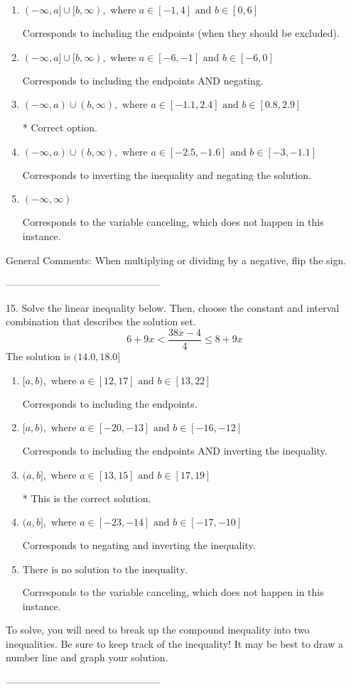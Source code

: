 \documentclass{article}[10pt]
\begin{document}
\begin{enumerate}[label=\Alph*.] 
\item $ (-\infty, a] \cup [b, \infty), \text{ where } a \in [-1, 4] \text{ and } b \in [0, 6] $ 

 Corresponds to including the endpoints (when they should be excluded). 
\item $ (-\infty, a] \cup [b, \infty), \text{ where } a \in [-6, -1] \text{ and } b \in [-6, 0] $ 

 Corresponds to including the endpoints AND negating. 
\item $ (-\infty, a) \cup (b, \infty), \text{ where } a \in [-1.1, 2.4] \text{ and } b \in [0.8, 2.9] $ 

  * Correct option. 
\item $ (-\infty, a) \cup (b, \infty), \text{ where } a \in [-2.5, -1.6] \text{ and } b \in [-3, -1.1] $ 

 Corresponds to inverting the inequality and negating the solution. 
\item $ (-\infty, \infty) $ 

 Corresponds to the variable canceling, which does not happen in this instance. 
\end{enumerate} 
 
General Comments: When multiplying or dividing by a negative, flip the sign.

-----------------------------------------------

15. Solve the linear inequality below. Then, choose the constant and interval combination that describes the solution set.
$$ 6 + 9 x < \frac{38 x - 4}{4} \leq 8 + 9 x $$ 
The solution is $ (14.0, 18.0] $ 

\begin{enumerate}[label=\Alph*.] 
\item $ [a, b), \text{ where } a \in [12, 17] \text{ and } b \in [13, 22] $ 

 Corresponds to including the endpoints. 
\item $ [a, b), \text{ where } a \in [-20, -13] \text{ and } b \in [-16, -12] $ 

 Corresponds to including the endpoints AND inverting the inequality. 
\item $ (a, b], \text{ where } a \in [13, 15] \text{ and } b \in [17, 19] $ 

  * This is the correct solution. 
\item $ (a, b], \text{ where } a \in [-23, -14] \text{ and } b \in [-17, -10] $ 

 Corresponds to negating and inverting the inequality. 
\item $ \text{There is no solution to the inequality.} $ 

 Corresponds to the variable canceling, which does not happen in this instance. 
\end{enumerate} 
 
To solve, you will need to break up the compound inequality into two inequalities. Be sure to keep track of the inequality! It may be best to draw a number line and graph your solution.

-----------------------------------------------
\end{document}
